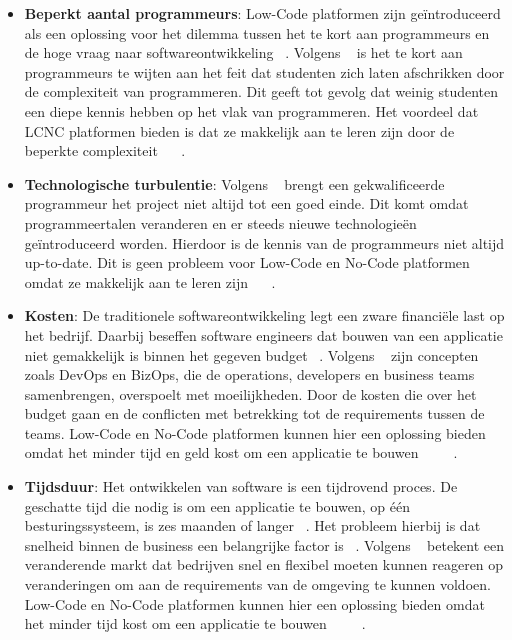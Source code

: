 \begin{itemize}
    \item \textbf{Beperkt aantal programmeurs}: 
    Low-Code platformen zijn geïntroduceerd als een oplossing voor het dilemma tussen het te kort aan programmeurs en de hoge vraag naar softwareontwikkeling ~\autocite{ALSAADI_2021}. Volgens 
    ~\textcite{Moskal_2021} is het te kort aan programmeurs te wijten aan het feit dat studenten zich laten afschrikken door de complexiteit van programmeren. Dit geeft tot gevolg dat weinig 
    studenten een diepe kennis hebben op het vlak van programmeren. Het voordeel dat LCNC platformen bieden is dat ze makkelijk aan te leren zijn door de beperkte complexiteit ~\autocite{ALSAADI_2021} ~\autocite{Sufi_2023}.
    \item \textbf{Technologische turbulentie}:
    Volgens ~\textcite{Moskal_2021} brengt een gekwalificeerde programmeur het project niet altijd tot een goed einde.
    Dit komt omdat programmeertalen veranderen en er steeds nieuwe technologieën geïntroduceerd worden. Hierdoor is de kennis van de programmeurs niet altijd up-to-date.
    Dit is geen probleem voor Low-Code en No-Code platformen omdat ze makkelijk aan te leren zijn ~\autocite{ALSAADI_2021} ~\autocite{Sufi_2023}.
    \item \textbf{Kosten}:
    De traditionele softwareontwikkeling legt een zware financiële last op het bedrijf. 
    Daarbij beseffen software engineers dat bouwen van een applicatie niet gemakkelijk is binnen het gegeven budget ~\autocite{Moskal_2021}. 
    Volgens ~\textcite{Elshan2023} zijn concepten zoals DevOps en BizOps, die de operations, developers en business teams samenbrengen, overspoelt met moeilijkheden. 
    Door de kosten die over het budget gaan en de conflicten met betrekking tot de requirements tussen de teams.
    Low-Code en No-Code platformen kunnen hier een oplossing bieden omdat het minder tijd en geld kost om een applicatie te bouwen ~\autocite{Elshan2023} ~\autocite{Bock_2021} ~\autocite{Rokis_2023}.
    \item \textbf{Tijdsduur}:
    Het ontwikkelen van software is een tijdrovend proces. De geschatte tijd die nodig is om een applicatie te bouwen, op één besturingssysteem, is zes maanden of langer ~\autocite{Moskal_2021}. 
    Het probleem hierbij is dat snelheid binnen de business een belangrijke factor is ~\autocite{Sanchis_2019}. 
    Volgens ~\textcite{Sanchis_2019} betekent een veranderende markt dat bedrijven snel en flexibel moeten kunnen reageren op veranderingen om aan de requirements van de omgeving te kunnen voldoen.
    Low-Code en No-Code platformen kunnen hier een oplossing bieden omdat het minder tijd kost om een applicatie te bouwen ~\autocite{Adrian_2020} ~\autocite{Bock_2021} ~\autocite{Rokis_2023}.


\end{itemize}
